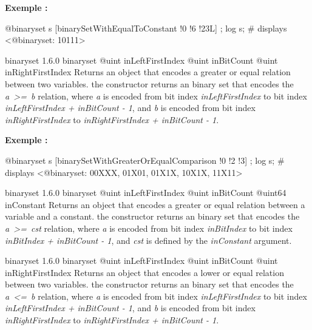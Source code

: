 \textbf{Exemple :}
\begin{galgascode}
@binaryset s [binarySetWithEqualToConstant !0 !6 !23L] ;
log s; # displays <@binaryset: 10111>
\end{galgascode}





{binaryset}
{1.6.0}
{binaryset}
{@uint inLeftFirstIndex}
{@uint inBitCount}
{@uint inRightFirstIndex}
{Returns an  object that encodes a greater or equal relation between two variables.}
{the constructor returns an binary set that encodes the \emph{a~>=~b} relation, where \emph{a} is encoded from bit index \emph{inLeftFirstIndex} to bit index \emph{inLeftFirstIndex  + inBitCount - 1}, and \emph{b} is encoded from bit index \emph{inRightFirstIndex} to \emph{inRightFirstIndex + inBitCount - 1}.}

\textbf{Exemple :}
\begin{galgascode}
@binaryset s [binarySetWithGreaterOrEqualComparison !0 !2 !3] ;
log s; # displays <@binaryset: 00XXX, 01X01, 01X1X, 10X1X, 11X11>
\end{galgascode}





{binaryset}
{1.6.0}
{binaryset}
{@uint inLeftFirstIndex}
{@uint inBitCount}
{@uint64 inConstant}
{Returns an  object that encodes a greater or equal relation between a variable and a constant.}
{the constructor returns an binary set that encodes the \emph{a~>=~cst} relation, where \emph {a} is encoded from bit index \emph{inBitIndex} to bit index \emph{inBitIndex  + inBitCount - 1}, and \emph{cst} is defined by the \emph{inConstant} argument.}





{binaryset}
{1.6.0}
{binaryset}
{@uint inLeftFirstIndex}
{@uint inBitCount}
{@uint inRightFirstIndex}
{Returns an  object that encodes a lower or equal relation between two variables.}
{the constructor returns an binary set that encodes the \emph{a~<=~b} relation, where \emph{a} is encoded from bit index \emph{inLeftFirstIndex} to bit index \emph{inLeftFirstIndex  + inBitCount - 1}, and \emph{b} is encoded from bit index \emph{inRightFirstIndex} to \emph{inRightFirstIndex + inBitCount - 1}.}

